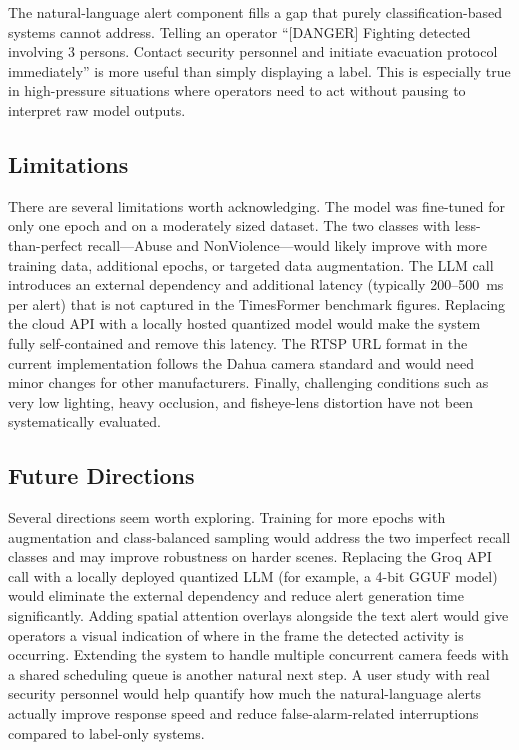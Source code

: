 \documentclass[conference]{IEEEtran}
\begin{document}
The natural-language alert component fills a gap that purely
classification-based systems cannot address. Telling an operator
``\textsc{[DANGER]} Fighting detected involving 3 persons. Contact
security personnel and initiate evacuation protocol immediately'' is
more useful than simply displaying a label. This is especially true in
high-pressure situations where operators need to act without pausing to
interpret raw model outputs.

\subsection{Limitations}

There are several limitations worth acknowledging. The model was
fine-tuned for only one epoch and on a moderately sized dataset. The two
classes with less-than-perfect recall---Abuse and NonViolence---would
likely improve with more training data, additional epochs, or targeted
data augmentation. The LLM call introduces an external dependency and
additional latency (typically 200--500~ms per alert) that is not
captured in the TimesFormer benchmark figures. Replacing the cloud API
with a locally hosted quantized model would make the system fully
self-contained and remove this latency. The RTSP URL format in the
current implementation follows the Dahua camera standard and would need
minor changes for other manufacturers. Finally, challenging conditions
such as very low lighting, heavy occlusion, and fisheye-lens distortion
have not been systematically evaluated.

\subsection{Future Directions}

Several directions seem worth exploring. Training for more epochs with
augmentation and class-balanced sampling would address the two imperfect
recall classes and may improve robustness on harder scenes. Replacing
the Groq API call with a locally deployed quantized LLM (for example,
a 4-bit GGUF model) would eliminate the external dependency and reduce
alert generation time significantly. Adding spatial attention overlays
alongside the text alert would give operators a visual indication of
where in the frame the detected activity is occurring. Extending the
system to handle multiple concurrent camera feeds with a shared
scheduling queue is another natural next step. A user study with real
security personnel would help quantify how much the natural-language
alerts actually improve response speed and reduce false-alarm-related
interruptions compared to label-only systems.
\end{document}
